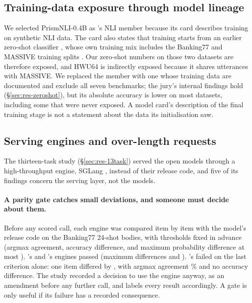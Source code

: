 \subsection{Training-data exposure through model lineage}
\label{sec:find-exposure}
We selected PrismNLI-0.4B as \gj's NLI member because its card describes training on synthetic NLI data. The card
also states that training starts from an earlier zero-shot classifier \citep{jung-2025-prismnli-card}, whose own
training mix includes the Banking77 and MASSIVE training splits \citep{laurer-2024-zeroshot-v2-card,laurer-2024-zeroshot-datasets}. Our zero-shot numbers on those two datasets
are therefore exposed, and HWU64 is indirectly exposed because it shares utterances with MASSIVE. We replaced the
member with one whose training data are documented and exclude all seven benchmarks; the jury's internal findings
hold (\S\ref{sec:res-zeroshot}), but its absolute accuracy is lower on most datasets, including some that were never
exposed. A model card's description of the final training stage is not a statement about the data its
initialisation saw.

\subsection{Serving engines and over-length requests}
\label{sec:find-serving}
The thirteen-task study (\S\ref{sec:res-13task}) served the open models through a high-throughput engine, SGLang
\citep{zheng-etal-2024-sglang}, instead of their release code, and five of its findings concern the serving layer, not the models.

\paragraph{A parity gate catches small deviations, and someone must decide about them.} Before any scored call,
each engine was compared item by item with the model's release code on the \dtGateItems{} Banking77 24-shot bodies,
with thresholds fixed in advance (argmax agreement, accuracy difference, and maximum probability difference at most
\dtGateThreshold). \pplx's and \flash's engines passed (maximum differences \fsPplxGateMaxDp{} and
\dtGateFlashMaxDp). \clef's failed on the last criterion alone: one item differed by \dtGateClefMaxDp, with argmax
agreement \dtGateClefAgree\% and no accuracy difference. The study recorded a decision to use the engine anyway, as
an amendment before any further call, and labels every \clef{} result accordingly. A gate is only useful if its
failure has a recorded consequence.


